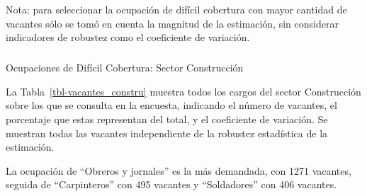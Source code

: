\documentclass[
  11pt,
]{article}
\makeatletter
\let\oldsubparagraph\subparagraph
\renewcommand{\subparagraph}{
    \@ifstar
      \xxxSubParagraphStar
      \xxxSubParagraphNoStar
  }
\newcommand{\xxxSubParagraphStar}[1]{\oldsubparagraph*{#1}\mbox{}}
\newcommand{\xxxSubParagraphNoStar}[1]{\oldsubparagraph{#1}\mbox{}}
\makeatother
\begin{document}
Nota: para seleccionar la ocupación de difícil cobertura con mayor
cantidad de vacantes sólo se tomó en cuenta la magnitud de la
estimación, sin considerar indicadores de robustez como el coeficiente
de variación. \newpage

\subparagraph{Ocupaciones de Difícil Cobertura: Sector
Construcción}\label{ocupaciones-de-difuxedcil-cobertura-sector-construcciuxf3n}

La Tabla~\ref{tbl-vacantes_constru} muestra todos los cargos del sector
Construcción sobre los que se consulta en la encuesta, indicando el
número de vacantes, el porcentaje que estas representan del total, y el
coeficiente de variación. Se muestran todas las vacantes independiente
de la robustez estadística de la estimación.

La ocupación de ``Obreros y jornales'' es la más demandada, con 1271
vacantes, seguida de ``Carpinteros'' con 495 vacantes y ``Soldadores''
con 406 vacantes.
\end{document}
